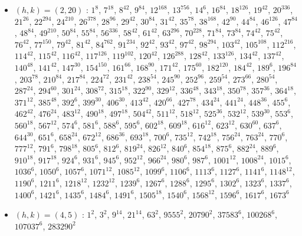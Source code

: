 \begin{itemize}
\item $(h,k)=(2,20)$ : $1^{8}$, $7^{18}$, $8^{42}$, $9^{84}$, $12^{168}$, $13^{756}$, $14^{6}$, $16^{84}$, $18^{126}$, $19^{42}$, $20^{336}$, $21^{26}$, $22^{294}$, $24^{210}$, $26^{378}$, $28^{96}$, $29^{42}$, $30^{84}$, $31^{42}$, $35^{78}$, $38^{168}$, $42^{90}$, $44^{84}$, $46^{126}$, $47^{84}$, $48^{84}$, $49^{210}$, $50^{84}$, $55^{84}$, $56^{336}$, $58^{42}$, $61^{42}$, $63^{296}$, $70^{228}$, $71^{84}$, $73^{84}$, $74^{42}$, $75^{42}$, $76^{42}$, $77^{150}$, $79^{42}$, $81^{42}$, $84^{762}$, $91^{234}$, $92^{42}$, $93^{42}$, $97^{42}$, $98^{294}$, $103^{42}$, $105^{108}$, $112^{216}$, $114^{42}$, $115^{42}$, $116^{42}$, $117^{126}$, $119^{102}$, $120^{42}$, $126^{288}$, $128^{42}$, $133^{126}$, $134^{42}$, $137^{42}$, $140^{48}$, $141^{42}$, $147^{30}$, $154^{150}$, $161^{66}$, $168^{90}$, $171^{42}$, $175^{60}$, $182^{120}$, $184^{42}$, $189^{6}$, $196^{84}$, $203^{78}$, $210^{84}$, $217^{84}$, $224^{72}$, $231^{42}$, $238^{54}$, $245^{90}$, $252^{96}$, $259^{54}$, $273^{66}$, $280^{54}$, $287^{24}$, $294^{60}$, $301^{24}$, $308^{72}$, $315^{18}$, $322^{90}$, $329^{12}$, $336^{48}$, $343^{18}$, $350^{78}$, $357^{36}$, $364^{18}$, $371^{12}$, $385^{48}$, $392^{6}$, $399^{30}$, $406^{30}$, $413^{42}$, $420^{66}$, $427^{78}$, $434^{24}$, $441^{24}$, $448^{36}$, $455^{6}$, $462^{42}$, $476^{24}$, $483^{12}$, $490^{18}$, $497^{18}$, $504^{42}$, $511^{12}$, $518^{12}$, $525^{36}$, $532^{12}$, $539^{30}$, $553^{6}$, $560^{18}$, $567^{12}$, $574^{6}$, $581^{6}$, $588^{6}$, $595^{6}$, $602^{18}$, $609^{18}$, $616^{12}$, $623^{12}$, $630^{60}$, $637^{6}$, $644^{30}$, $651^{6}$, $658^{24}$, $672^{12}$, $686^{36}$, $693^{18}$, $700^{6}$, $735^{12}$, $742^{18}$, $756^{24}$, $763^{24}$, $770^{6}$, $777^{12}$, $791^{6}$, $798^{18}$, $805^{6}$, $812^{6}$, $819^{24}$, $826^{12}$, $840^{6}$, $854^{18}$, $875^{6}$, $882^{24}$, $889^{6}$, $910^{18}$, $917^{18}$, $924^{6}$, $931^{6}$, $945^{6}$, $952^{12}$, $966^{24}$, $980^{6}$, $987^{6}$, $1001^{12}$, $1008^{24}$, $1015^{6}$, $1036^{6}$, $1050^{6}$, $1057^{6}$, $1071^{12}$, $1085^{12}$, $1099^{6}$, $1106^{6}$, $1113^{6}$, $1127^{6}$, $1141^{6}$, $1148^{12}$, $1190^{6}$, $1211^{6}$, $1218^{12}$, $1232^{12}$, $1239^{6}$, $1267^{6}$, $1288^{6}$, $1295^{6}$, $1302^{6}$, $1323^{6}$, $1337^{6}$, $1400^{6}$, $1421^{6}$, $1435^{6}$, $1484^{6}$, $1491^{6}$, $1505^{18}$, $1540^{6}$, $1568^{12}$, $1596^{6}$, $1617^{6}$, $1673^{6}$
\item $(h,k)=(4,5)$ : $1^{2}$, $3^{2}$, $9^{14}$, $21^{14}$, $63^{2}$, $9555^{2}$, $20790^{2}$, $37583^{6}$, $100268^{6}$, $107037^{6}$, $283290^{2}$

\end{itemize}

